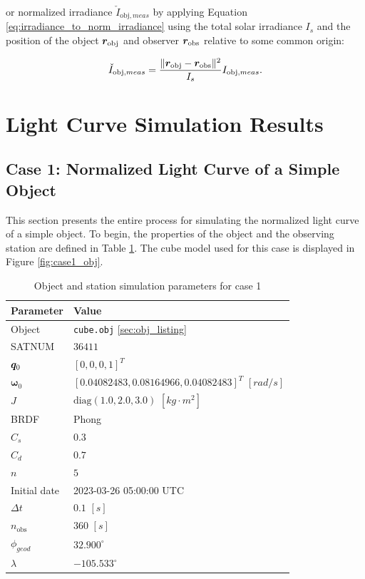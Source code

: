 or normalized irradiance $\check{I}_{\mathrm{obj},meas}$ by applying Equation \ref{eq:irradiance_to_norm_irradiance} using the total solar irradiance $I_s$ and the position of the object $\bm{r}_\mathrm{obj}$ and observer $\bm{r}_\mathrm{obs}$ relative to some common origin:

\begin{equation} \label{eq:ihat_meas}
  \check{I}_{\mathrm{obj},meas} = \frac{\| \bm{r}_\mathrm{obj} - \bm{r}_\mathrm{obs} \|^2}{I_s} I_{\mathrm{obj},meas}.
\end{equation}

\section{Light Curve Simulation Results}

\subsection{Case 1: Normalized Light Curve of a Simple Object}

This section presents the entire process for simulating the normalized light curve of a simple object. To begin, the properties of the object and the observing station are defined in Table \ref{tb:case1_obj_props}. The cube model used for this case is displayed in Figure \ref{fig:case1_obj}.

\begin{table}[]
  \centering
  \caption{Object and station simulation parameters for case 1}
  \vspace*{6pt}
  \begin{tabular}{|l|l|}
  \hline
  \textbf{Parameter} & \textbf{Value} \\ \hline
  Object & \texttt{cube.obj} \ref{sec:obj_listing} \\ \hline
  SATNUM & $36411$ \\ \hline
  $\bm{q}_0$ & $\left[ 0, 0, 0, 1 \right]^T$ \\ \hline
  $\boldsymbol{\omega}_0$ & $\left[ 0.04082483, 0.08164966, 0.04082483 \right]^T$ $[rad/s]$ \\ \hline
  $J$ & $\mathrm{diag}\left( 1.0, 2.0, 3.0 \right)$ $\left[ kg \cdot m^2 \right]$ \\ \hline
  BRDF & Phong \\ \hline
  $C_s$ & $0.3$ \\ \hline
  $C_d$ & $0.7$ \\ \hline
  $n$ & $5$ \\ \hline
  Initial date & 2023-03-26 05:00:00 UTC \\ \hline
  $\Delta t$ & $0.1$ $[s]$ \\ \hline
  $n_\mathrm{obs}$ & $360$ $[s]$ \\ \hline
  $\phi_{geod}$ & $32.900^\circ$ \\ \hline
  $\lambda$ & $-105.533^\circ$ \\ \hline
  \end{tabular}
  \label{tb:case1_obj_props}
\end{table}

